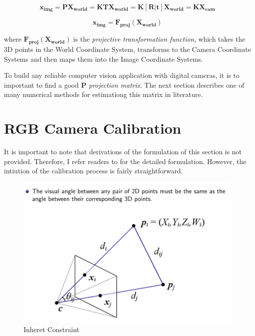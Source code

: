 \documentclass[a4paper]{report}
\numberwithin{figure}{section}
\begin{document}
\begin{equation}
  \mathbf{x_{img}} = 
  \mathbf{P}\mathbf{X_{world}} = 
  \mathbf{K}\mathbf{T}\mathbf{X_{world}} = 
  \mathbf{K}[\mathbf{R}|\mathbf{t}]\mathbf{X_{world}} =
  \mathbf{K}\mathbf{X_{cam}}
\end{equation} \label{eq:simplyfied_proj_func_1}

\begin{equation}
  \mathbf{x_{img}} = \mathbf{F_{proj}}(\mathbf{X_{world}})
\end{equation} \label{eq:simplyfied_proj_func_2}

where $\mathbf{F_{proj}}(\mathbf{X_{world}})$ is the 
\textit{projective transformation function}, which takes 
the 3D points in the World Coordinate System, transforms to 
the Camera Coordinate Systems and then maps them into the Image 
Coordinate Systems.

To build any reliable computer vision application with digital cameras, it is 
to important to find a good $\mathbf{P}$ \textit{projection matrix}. 
The next section describes one of many numerical methods for estimationg this 
matrix in literature.

\section{RGB Camera Calibration} \label{sb_sc_calibration}


It is important to note that derivations of the formulation of this section
is not provided. Therefore, I refer readers to \cite{bla} for the detailed 
formulation. However, the intiution of the calibration process is fairly 
straightforward. 

\begin{figure}[H]
	\centering
  \includegraphics[width=\linewidth,natwidth=640,natheight=640]
  {fig/ref_imgs/calibration_dlt.png}
  \caption{Inheret Constraint}
  \label{fig:calibration_constraint}
\end{figure}
\end{document}
